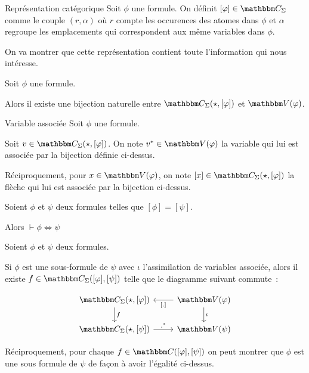\begin{defi}{Représentation catégorique}
    Soit $\phi$ une formule. On définit $[\phi]\in\C_\Sigma$ comme le couple $(r,\alpha)$
    où $r$ compte les occurences des atomes dans $\phi$ et $\alpha$ regroupe les
    emplacements qui correspondent aux même variables dans $\phi$.
\end{defi}

On va montrer que cette représentation contient toute l'information qui nous intéresse.

\begin{lem}
    Soit $\phi$ une formule.

    Alors il existe une bijection naturelle entre $\C_\Sigma(\star, [\phi])$ et
    $\V(\phi)$.
\end{lem}

\begin{defi}{Variable associée}
    Soit $\phi$ une formule.

    Soit $v\in\C_\Sigma(\star, [\phi])$. On note $v^*\in\V(\phi)$ la variable qui
    lui est associée par la bijection définie ci-dessus.

    Réciproquement, pour $x\in\V(\phi)$, on note $[x]\in\C_\Sigma(\star, [\phi])$
    la flèche qui lui est associée par la bijection ci-dessus.
\end{defi}

\begin{lem}\label{concretCompIff}
    Soient $\phi$ et $\psi$ deux formules telles que $[\phi] = [\psi]$.

    Alors $\vdash \phi\iff\psi$
\end{lem}

\begin{lem}\label{varAlongSub}
    Soient $\phi$ et $\psi$ deux formules.
    
    Si $\phi$ est une sous-formule de $\psi$ avec $\iota$ l'assimilation de
    variables associée, alors il existe $f\in\C_\Sigma([\phi], [\psi])$ telle
    que le diagramme suivant commute~:

    \[\begin{tikzcd}
        \C_\Sigma(\star,[\phi]) \arrow[d, "f"] & \V(\phi) \arrow[d, "\iota"]
                                                          \arrow[l, "\brk{.}"] \\
        \C_\Sigma(\star,[\psi]) \arrow[r, ".^*"] & \V(\psi)
    \end{tikzcd}\]

    Réciproquement, pour chaque $f\in\C([\phi], [\psi])$ on peut montrer que $\phi$ est
    une sous formule de $\psi$ de façon à avoir l'égalité ci-dessus.
\end{lem}

